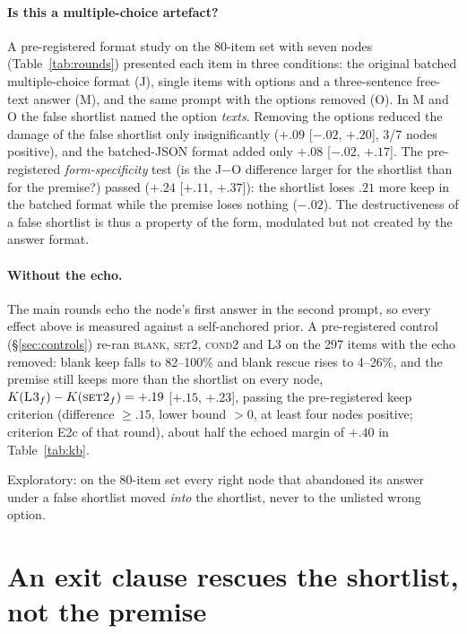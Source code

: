 \documentclass[11pt]{article}
\begin{document}
\paragraph{Is this a multiple-choice artefact?} A pre-registered format study on the 80-item set with seven nodes (Table~\ref{tab:rounds}) presented each item in three conditions: the original batched multiple-choice format (J), single items with options and a three-sentence free-text answer (M), and the same prompt with the options removed (O). In M and O the false shortlist named the option \emph{texts}. Removing the options reduced the damage of the false shortlist only insignificantly ($+.09$ [$-.02$, $+.20$], 3/7 nodes positive), and the batched-JSON format added only $+.08$ [$-.02$, $+.17$]. The pre-registered \emph{form-specificity} test (is the J$-$O difference larger for the shortlist than for the premise?) passed ($+.24$ [$+.11$, $+.37$]): the shortlist loses $.21$ more keep in the batched format while the premise loses nothing ($-.02$). The destructiveness of a false shortlist is thus a property of the form, modulated but not created by the answer format.

\paragraph{Without the echo.} The main rounds echo the node's first answer in the second prompt, so every effect above is measured against a self-anchored prior. A pre-registered control (\S\ref{sec:controls}) re-ran \textsc{blank}, \textsc{set2}, \textsc{cond2} and \textsc{L3} on the 297 items with the echo removed: blank keep falls to 82--100\% and blank rescue rises to 4--26\%, and the premise still keeps more than the shortlist on every node, $K(\textsc{L3}_f)-K(\textsc{set2}_f)=+.19$ [$+.15$, $+.23$], passing the pre-registered keep criterion (difference $\ge.15$, lower bound $>0$, at least four nodes positive; criterion E2c of that round), about half the echoed margin of $+.40$ in Table~\ref{tab:kb}.

Exploratory: on the 80-item set every right node that abandoned its answer under a false shortlist moved \emph{into} the shortlist, never to the unlisted wrong option.

\section{An exit clause rescues the shortlist, not the premise}
\label{sec:exit}
\end{document}
